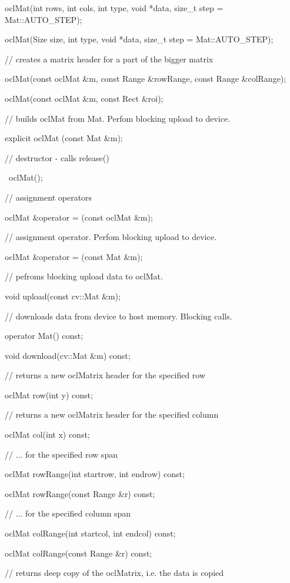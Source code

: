 \documentclass{article}
\begin{document}
    oclMat(int rows, int cols, int type, void *data, size\_t step = Mat::AUTO\_STEP);

    oclMat(Size size, int type, void *data, size\_t step = Mat::AUTO\_STEP);

    // creates a matrix header for a part of the bigger matrix

    oclMat(const oclMat \&m, const Range \&rowRange, const Range \&colRange);

    oclMat(const oclMat \&m, const Rect \&roi);

    // builds oclMat from Mat. Perfom blocking upload to device.

    explicit oclMat (const Mat \&m);


    // destructor - calls release()

    ~oclMat();

    // assignment operators

    oclMat \&operator = (const oclMat \&m);

    // assignment operator. Perfom blocking upload to device.

    oclMat \&operator = (const Mat \&m);



    // pefroms blocking upload data to oclMat.

    void upload(const cv::Mat \&m);


    // downloads data from device to host memory. Blocking calls.

    operator Mat() const;

    void download(cv::Mat \&m) const;



    // returns a new oclMatrix header for the specified row

     oclMat row(int y) const;

     // returns a new oclMatrix header for the specified column

     oclMat col(int x) const;

     // ... for the specified row span

     oclMat rowRange(int startrow, int endrow) const;

     oclMat rowRange(const Range \&r) const;

     // ... for the specified column span

     oclMat colRange(int startcol, int endcol) const;

     oclMat colRange(const Range \&r) const;


     // returns deep copy of the oclMatrix, i.e. the data is copied
\end{document}
